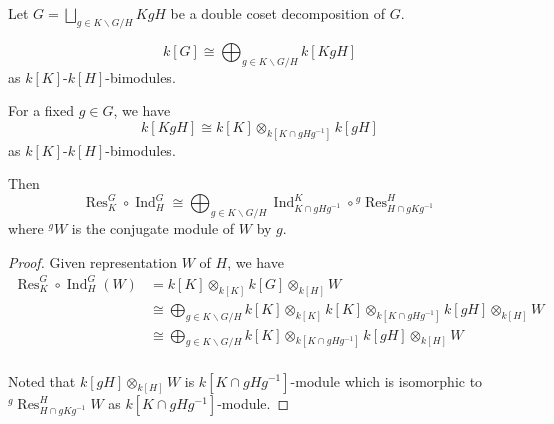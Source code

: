 \documentclass[12pt, oneside]{book}
\begin{document}
Let $G=\bigsqcup_{g\in K\backslash G/H} KgH$ be a double coset decomposition of $G$.

\begin{proposition}
    \begin{equation*}
        k[G]
        \cong
        \bigoplus_{g\in K\backslash G/H} k[KgH]
    \end{equation*}
    as $k[K]$-$k[H]$-bimodules.
\end{proposition}

\begin{proposition}
    For a fixed $g \in G$, we have
    \begin{equation*}
        k[KgH]
        \cong
        k[K] \otimes_{k[K\cap gHg^{-1}]} k[gH]
    \end{equation*}
    as $k[K]$-$k[H]$-bimodules.
\end{proposition}


\begin{theorem}
    Then
    \begin{equation*}
        \operatorname{Res}_K^G \circ \operatorname{Ind}_H^G
        \cong
        \bigoplus_{g\in K\backslash G/H} \operatorname{Ind}_{K\cap gHg^{-1}}^K \circ {}^g \operatorname{Res}^{H}_{H\cap gKg^{-1}}
    \end{equation*}
    where ${}^g W$ is the conjugate module of $W$ by $g$.
    \begin{proof}
        Given representation $W$ of $H$, we have
        \begin{equation*}
            \begin{aligned}
                \operatorname{Res}_K^G \circ \operatorname{Ind}_H^G \left(W\right) &
                = k[K]\otimes_{k[K]} k[G] \otimes_{k[H]} W                                                                                                                                             \\
                                                                                   & \cong \bigoplus_{g\in K\backslash G/H} k[K]\otimes_{k[K]} k[K] \otimes_{k[K\cap gHg^{-1}]} k[gH] \otimes_{k[H]} W \\
                                                                                   & \cong \bigoplus_{g\in K\backslash G/H} k[K] \otimes_{k[K\cap gHg^{-1}]} k[gH] \otimes_{k[H]} W                    \\
            \end{aligned}
        \end{equation*}

        Noted that $k[gH]\otimes_{k[H]} W $ is $k[K\cap gHg^{-1}]$-module which is isomorphic to ${}^g \operatorname{Res}^{H}_{H\cap gKg^{-1}} W$ as $k[K\cap gHg^{-1}]$-module.
    \end{proof}
\end{theorem}
\end{document}
